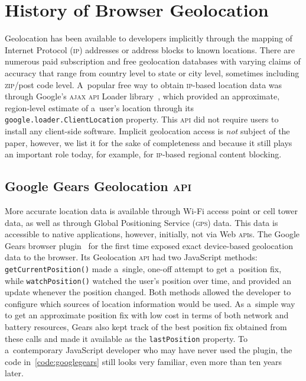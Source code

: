 \documentclass[sigconf,hyphens]{acmart}
\begin{document}


\maketitle

\section{History of Browser Geolocation}

Geolocation has been available to developers implicitly through the mapping of
Internet Protocol (\textsc{ip}) addresses or address blocks to known locations.
There are numerous paid subscription and free geolocation databases
with varying claims of accuracy that range from country level to state or city level,
sometimes including \textsc{zip}/post code level.
A~popular free way to obtain \textsc{ip}-based location data was
through Google's \textsc{ajax} \textsc{api} Loader library~\cite{block2008gears},
which provided an approximate, region-level estimate of a~user's location
through its \texttt{google.loader.ClientLocation} property.
This \textsc{api} did not require users to install any client-side software.
Implicit geolocation access is \textit{not} subject of the paper, however,
we list it for the sake of completeness and because it still plays an important role today,
for example, for \textsc{ip}-based regional content blocking.

\subsection{Google Gears Geolocation \textsc{api}}
\label{sec:googlegears}

More accurate location data is available through Wi-Fi access point or cell tower data,
as well as through Global Positioning Service (\textsc{gps}) data.
This data is accessible to native applications, however, initially, not via Web \textsc{api}s.
The Google Gears browser plugin~\cite{gears2008geolocation} for the first time exposed
exact device-based geolocation data to the browser. 
Its Geolocation \textsc{api} had two JavaScript methods:
\texttt{getCurrentPosition()} made a~single, one-off attempt to get a~position fix,
while \texttt{watchPosition()} watched the user's position over time,
and provided an update whenever the position changed.
Both methods allowed the developer to configure
which sources of location information would be used.
As a~simple way to get an approximate position fix with low cost
in terms of both network and battery resources,
Gears also kept track of the best position fix obtained from these calls
and made it available as the \texttt{lastPosition} property.
To a~contemporary JavaScript developer who may have never used the plugin,
the code in~\autoref{code:googlegears} still looks very familiar,
even more than ten years later.
\end{document}
